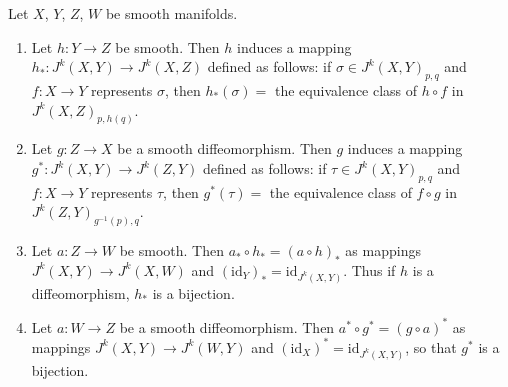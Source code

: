 Let $X$, $Y$, $Z$, $W$ be smooth manifolds.

\begin{enumerate}
\item Let $h: Y \to Z$ be smooth. Then $h$ induces a mapping $h_*: J^k(X, Y) \to J^k(X, Z)$ defined as follows: if $\sigma \in J^k(X, Y)_{p,q}$ and $f: X \to Y$ represents $\sigma$, then $h_*(\sigma) =$ the equivalence class of $h \circ f$ in $J^k(X, Z)_{p, h(q)}$.

\item Let $g: Z \to X$ be a smooth diffeomorphism. Then $g$ induces a mapping $g^*: J^k(X, Y) \to J^k(Z, Y)$ defined as follows: if $\tau \in J^k(X, Y)_{p,q}$ and $f: X \to Y$ represents $\tau$, then $g^*(\tau) =$ the equivalence class of $f \circ g$ in $J^k(Z, Y)_{g^{-1}(p), q}$.

\item Let $a: Z \to W$ be smooth. Then $a_* \circ h_* = (a \circ h)_*$ as mappings $J^k(X, Y) \to J^k(X, W)$ and $(\mathrm{id}_Y)_* = \mathrm{id}_{J^k(X, Y)}$. Thus if $h$ is a diffeomorphism, $h_*$ is a bijection.

\item Let $a: W \to Z$ be a smooth diffeomorphism. Then $a^* \circ g^* = (g \circ a)^*$ as mappings $J^k(X, Y) \to J^k(W, Y)$ and $(\mathrm{id}_X)^* = \mathrm{id}_{J^k(X, Y)}$, so that $g^*$ is a bijection.
\end{enumerate}
